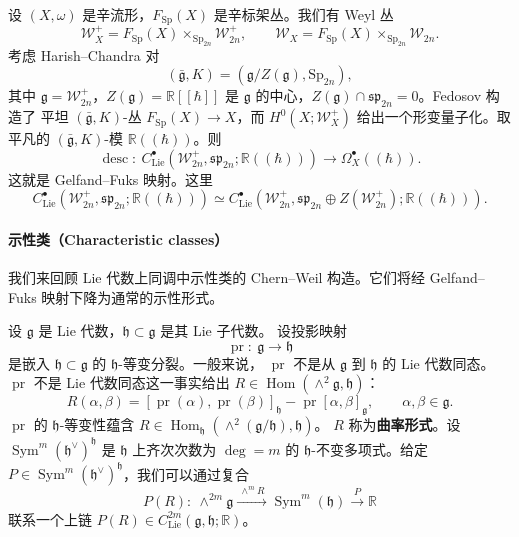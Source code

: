 设 $(X,\omega)$ 是辛流形，$F_{\mathrm{Sp}}(X)$ 是辛标架丛。我们有 Weyl 丛
\[
  \mathcal{W}^+_X=F_{\mathrm{Sp}}(X)\times_{\mathrm{Sp}_{2n}}\mathcal{W}^+_{2n},
  \qquad
  \mathcal{W}_X=F_{\mathrm{Sp}}(X)\times_{\mathrm{Sp}_{2n}}\mathcal{W}_{2n}.
\]
考虑 Harish--Chandra 对
\[
  (\bar{\mathfrak{g}},K)=(\mathfrak{g}/Z(\mathfrak{g}),\mathrm{Sp}_{2n}),
\]
其中 $\mathfrak{g}=\mathcal{W}^+_{2n}$，$Z(\mathfrak{g})=\mathbb{R}[[\hbar]]$ 是
$\mathfrak{g}$ 的中心，$Z(\mathfrak{g})\cap\mathfrak{sp}_{2n}=0$。Fedosov 构造了
平坦 $(\bar{\mathfrak{g}},K)$-丛 $F_{\mathrm{Sp}}(X)\to X$，而
$H^0(X;\mathcal{W}^+_X)$ 给出一个形变量子化。取平凡的
$(\bar{\mathfrak{g}},K)$-模 $\mathbb{R}((\hbar))$。则
\[
  \operatorname{desc}:\ C^\bullet_{\mathrm{Lie}}\left(\mathcal{W}^+_{2n},
  \mathfrak{sp}_{2n};\mathbb{R}((\hbar))\right)\longrightarrow\Omega^\bullet_X((\hbar)).
\]
这就是 Gelfand--Fuks 映射。这里
\[
  C^\bullet_{\mathrm{Lie}}\left(\mathcal{W}^+_{2n},\mathfrak{sp}_{2n};
  \mathbb{R}((\hbar))\right)
  \simeq C^\bullet_{\mathrm{Lie}}\left(\mathcal{W}^+_{2n},
  \mathfrak{sp}_{2n}\oplus Z(\mathcal{W}^+_{2n});\mathbb{R}((\hbar))\right).
\]


\paragraph*{示性类（Characteristic classes）}

我们来回顾 Lie 代数上同调中示性类的 Chern--Weil 构造。它们将经 Gelfand--Fuks
映射下降为通常的示性形式。

设 $\mathfrak{g}$ 是 Lie 代数，$\mathfrak{h}\subset\mathfrak{g}$ 是其 Lie 子代数。
设投影映射
\[
  \operatorname{pr}:\ \mathfrak{g}\longrightarrow\mathfrak{h}
\]
是嵌入 $\mathfrak{h}\subset\mathfrak{g}$ 的 $\mathfrak{h}$-等变分裂。一般来说，
$\operatorname{pr}$ 不是从 $\mathfrak{g}$ 到 $\mathfrak{h}$ 的 Lie 代数同态。
$\operatorname{pr}$ 不是 Lie 代数同态这一事实给出
$R\in\operatorname{Hom}(\wedge^2\mathfrak{g},\mathfrak{h})$：
\[
  R(\alpha,\beta)=[\operatorname{pr}(\alpha),\operatorname{pr}(\beta)]_{\mathfrak{h}}
  -\operatorname{pr}[\alpha,\beta]_{\mathfrak{g}},\qquad \alpha,\beta\in\mathfrak{g}.
\]
$\operatorname{pr}$ 的 $\mathfrak{h}$-等变性蕴含
$R\in\operatorname{Hom}_{\mathfrak{h}}(\wedge^2(\mathfrak{g}/\mathfrak{h}),\mathfrak{h})$。
$R$ 称为\textbf{曲率形式}。设 $\operatorname{Sym}^m(\mathfrak{h}^\vee)^{\mathfrak{h}}$
是 $\mathfrak{h}$ 上齐次次数为 $\deg=m$ 的 $\mathfrak{h}$-不变多项式。给定
$P\in\operatorname{Sym}^m(\mathfrak{h}^\vee)^{\mathfrak{h}}$，我们可以通过复合
\[
  P(R):\ \wedge^{2m}\mathfrak{g}\xrightarrow{\ \wedge^m R\ }
  \operatorname{Sym}^m(\mathfrak{h})\xrightarrow{\ P\ }\mathbb{R}
\]
联系一个上链 $P(R)\in C^{2m}_{\mathrm{Lie}}(\mathfrak{g},\mathfrak{h};\mathbb{R})$。

